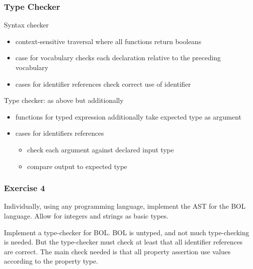 \begin{frame}\frametitle{Type Checker}
Syntax checker
\begin{itemize}
 \item context-sensitive traversal where all functions return booleans
 \item case for vocabulary checks each declaration relative to the preceding vocabulary
 \item cases for identifier references check correct use of identifier
\end{itemize}

Type checker: as above but additionally
\begin{itemize}
 \item functions for typed expression additionally take expected type as argument
 \item cases for identifiers references
   \begin{itemize}
   \item check each argument against declared input type
   \item compare output to expected type
   \end{itemize}
\end{itemize}
\end{frame}

\begin{frame}\frametitle{Exercise 4}
Individually, using any programming language, implement the AST for the BOL language.
Allow for integers and strings as basic types.

Implement a type-checker for BOL.
BOL is untyped, and not much type-checking is needed.
But the type-checker must check at least that all identifier references are correct.
The main check needed is that all property assertion use values according to the property type.
\end{frame}
